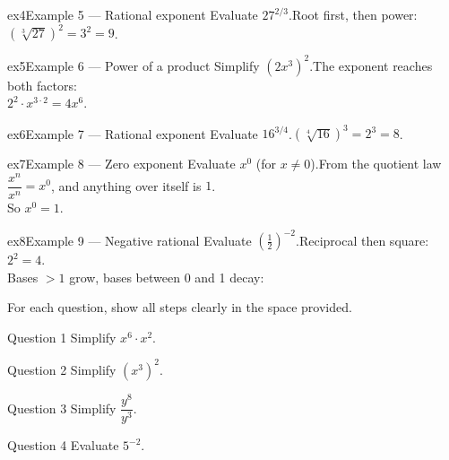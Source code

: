 \documentclass[11pt]{article}
\begin{document}
\begin{example}{ex4}{Example 5 --- Rational exponent}
Evaluate $27^{2/3}$.\soln Root first, then power: \\ $\left(\sqrt[3]{27}\right)^2=3^2=9$.
\end{example}

\begin{example}{ex5}{Example 6 --- Power of a product}
Simplify $(2x^3)^2$.\soln The exponent reaches both factors: \\ $2^2\cdot x^{3\cdot2}=4x^6$.
\end{example}

\begin{example}{ex6}{Example 7 --- Rational exponent}
Evaluate $16^{3/4}$.\soln $\left(\sqrt[4]{16}\right)^3=2^3=8$.
\end{example}

\begin{example}{ex7}{Example 8 --- Zero exponent}
Evaluate $x^0$ (for $x\ne0$).\soln From the quotient law $\dfrac{x^n}{x^n}=x^{0}$, and anything over itself is $1$. \\ So $x^0=1$.
\end{example}

\begin{example}{ex8}{Example 9 --- Negative rational}
Evaluate $\left(\tfrac12\right)^{-2}$.\soln Reciprocal then square: $2^2=4$. \\ Bases $>1$ grow, bases between 0 and 1 decay:
\end{example}

\clearpage
{}
For each question, show all steps clearly in the space provided.

\begin{qbox}{Question 1}
Simplify $x^6\cdot x^2$.\workspace{2.4cm}
\end{qbox}

\begin{qbox}{Question 2}
Simplify $(x^3)^2$.\workspace{2.4cm}
\end{qbox}

\begin{qbox}{Question 3}
Simplify $\dfrac{y^8}{y^3}$.\workspace{2.4cm}
\end{qbox}

\begin{qbox}{Question 4}
Evaluate $5^{-2}$.\workspace{2.4cm}
\end{qbox}
\end{document}
